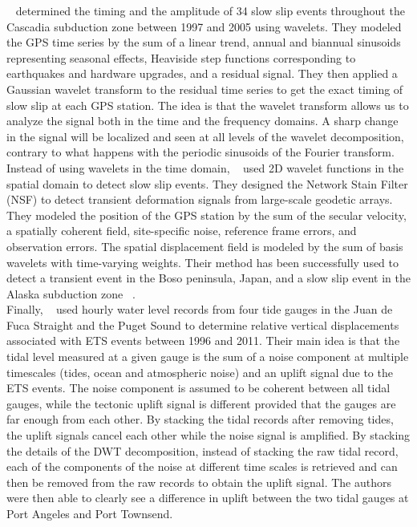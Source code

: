\documentclass{article}
\begin{document}
~\citet{SZE_2008} determined the timing and the amplitude of 34 slow slip events throughout the Cascadia subduction zone between 1997 and 2005 using wavelets. They modeled the GPS time series by the sum of a linear trend, annual and biannual sinusoids representing seasonal effects, Heaviside step functions corresponding to earthquakes and hardware upgrades, and a residual signal. They then applied a Gaussian wavelet transform to the residual time series to get the exact timing of slow slip at each GPS station. The idea is that the wavelet transform allows us to analyze the signal both in the time and the frequency domains. A sharp change in the signal will be localized and seen at all levels of the wavelet decomposition, contrary to what happens with the periodic sinusoids of the Fourier transform. \\

Instead of using wavelets in the time domain, ~\citet{OHT_2010} used 2D wavelet functions in the spatial domain to detect slow slip events. They designed the Network Stain Filter (NSF) to detect transient deformation signals from large-scale geodetic arrays. They modeled the position of the GPS station by the sum of the secular velocity, a spatially coherent field, site-specific noise, reference frame errors, and observation errors. The spatial displacement field is modeled by the sum of basis wavelets with time-varying weights.  Their method has been successfully used to detect a transient event in the Boso peninsula, Japan, and a slow slip event in the Alaska subduction zone ~\citep{WEI_2012}. \\

Finally, ~\citet{ALB_2019} used hourly water level records from four tide gauges in the Juan de Fuca Straight and the Puget Sound to determine relative vertical displacements associated with ETS events between 1996 and 2011. Their main idea is that the tidal level measured at a given gauge is the sum of a noise component at multiple timescales (tides, ocean and atmospheric noise) and an uplift signal due to the ETS events. The noise component is assumed to be coherent between all tidal gauges, while the tectonic uplift signal is different provided that the gauges are far enough from each other. By stacking the tidal records after removing tides, the uplift signals cancel each other while the noise signal is amplified. By stacking the details of the DWT decomposition, instead of stacking the raw tidal record, each of the components of the noise at different time scales is retrieved and can then be removed from the raw records to obtain the uplift signal. The authors were then able to clearly see a difference in uplift between the two tidal gauges at Port Angeles and Port Townsend. \\
\end{document}

